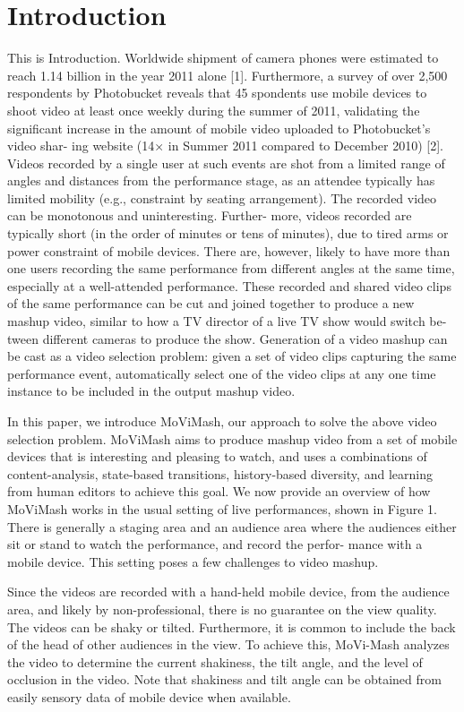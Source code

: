 \documentclass{sig-alternate-05-2015}
\begin{document}
\section{Introduction}
This is Introduction.
Worldwide shipment of camera phones were estimated to reach
1.14 billion in the year 2011 alone [1]. Furthermore, a survey of
over 2,500 respondents by Photobucket reveals that 45%
spondents use mobile devices to shoot video at least once weekly during the summer of 2011, validating the significant increase in
the amount of mobile video uploaded to Photobucket’s video shar-
ing website (14× in Summer 2011 compared to December 2010) [2]. Videos recorded by
a single user at such events are shot from a limited range of angles and distances from the performance stage, as an attendee typically has limited mobility (e.g., constraint by seating arrangement).
The recorded video can be monotonous and uninteresting. Further-
more, videos recorded are typically short (in the order of minutes
or tens of minutes), due to tired arms or power constraint of mobile
devices. There are, however, likely to have more than one users
recording the same performance from different angles at the same
time, especially at a well-attended performance.
These recorded and shared video clips of the same performance
can be cut and joined together to produce a new mashup video,
similar to how a TV director of a live TV show would switch be-
tween different cameras to produce the show. Generation of a video
mashup can be cast as a video selection problem: given a set of
video clips capturing the same performance event, automatically
select one of the video clips at any one time instance to be included
in the output mashup video.

In this paper, we introduce MoViMash, our approach to solve
the above video selection problem. MoViMash aims to produce
mashup video from a set of mobile devices that is interesting and
pleasing to watch, and uses a combinations of content-analysis,
state-based transitions, history-based diversity, and learning from
human editors to achieve this goal.
We now provide an overview of how MoViMash works in the
usual setting of live performances, shown in Figure 1. There is
generally a staging area and an audience area where the audiences
either sit or stand to watch the performance, and record the perfor-
mance with a mobile device. This setting poses a few challenges to
video mashup.

Since the videos are recorded with a hand-held mobile device,
from the audience area, and likely by non-professional, there is no
guarantee on the view quality. The videos can be shaky or tilted.
Furthermore, it is common to include the back of the head of other audiences in the view. To achieve this, MoVi-Mash analyzes the video to determine the current shakiness, the tilt
angle, and the level of occlusion in the video. Note that shakiness and tilt angle can be obtained from easily sensory data of mobile
device when available.
\end{document}
